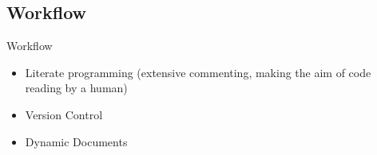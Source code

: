 \documentclass[aspectratio=169]{beamer}
\begin{document}
%

 \subsection*{Workflow}
%

\begin{frame}{Workflow}
 \begin{itemize}
 \item Literate programming (extensive commenting, making the aim of code reading by a human)
 \item Version Control
 \item Dynamic Documents
\end{itemize}
\end{frame}
\end{document}
